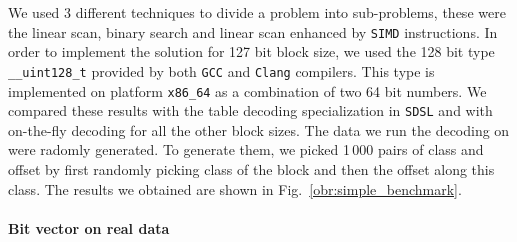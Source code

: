 We used 3 different techniques to divide a problem into sub-problems, these were the linear scan,
binary search and linear scan enhanced by \texttt{SIMD} instructions. In order to implement the
solution for 127 bit block size, we used the 128 bit type \texttt{\_\_uint128\_t} provided by both
\texttt{GCC} and \texttt{Clang} compilers. This type is implemented on platform \texttt{x86\_64}
as a combination of two 64 bit numbers. We compared these results with the table decoding specialization
in \texttt{SDSL} and with on-the-fly decoding for all the other block sizes. The data we run the decoding
on were radomly generated. To generate them, we picked 1\,000 pairs of class and offset by first randomly
picking class of the block and then the offset along this class. The results we obtained are shown in
Fig.~\ref{obr:simple_benchmark}.

\paragraph{Bit vector on real data}

